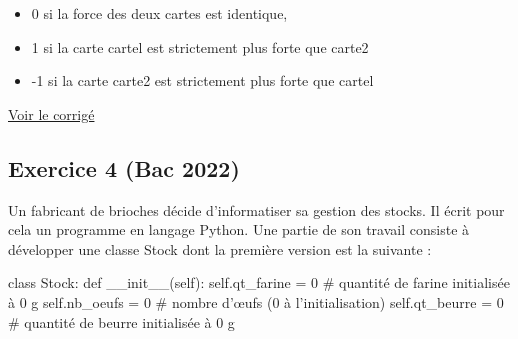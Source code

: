 \documentclass[
  a4paper,
  DIV=11,
  numbers=noendperiod]{scrartcl}
\newenvironment{Shaded}{\begin{snugshade}}{\end{snugshade}}
\newcommand{\CommentTok}[1]{\textcolor[rgb]{0.37,0.37,0.37}{#1}}
\newcommand{\DecValTok}[1]{\textcolor[rgb]{0.68,0.00,0.00}{#1}}
\newcommand{\FunctionTok}[1]{\textcolor[rgb]{0.28,0.35,0.67}{#1}}
\newcommand{\KeywordTok}[1]{\textcolor[rgb]{0.00,0.23,0.31}{#1}}
\newcommand{\NormalTok}[1]{\textcolor[rgb]{0.00,0.23,0.31}{#1}}
\newcommand{\OperatorTok}[1]{\textcolor[rgb]{0.37,0.37,0.37}{#1}}
\newcommand{\VariableTok}[1]{\textcolor[rgb]{0.07,0.07,0.07}{#1}}
\providecommand{\tightlist}{%
  \setlength{\itemsep}{0pt}\setlength{\parskip}{0pt}}\usepackage{longtable,booktabs,array}
\begin{document}
\begin{enumerate}
  \begin{itemize}
  \tightlist
  \item
    0 si la force des deux cartes est identique,
  \item
    1 si la carte cartel est strictement plus forte que carte2
  \item
    -1 si la carte carte2 est strictement plus forte que cartel
  \end{itemize}
\end{enumerate}

\href{https://flallemand.fr/notebook/?from=https://flallemand.fr/nsi/assets/notebooks/exo3_POO_CORR.ipynb}{Voir
le corrigé}

\hypertarget{fa-solid-pencil-alt-exercice-4-bac-2022}{%
\subsection{\texorpdfstring{ Exercice 4 (Bac
2022)}{ Exercice 4 (Bac 2022)}}\label{fa-solid-pencil-alt-exercice-4-bac-2022}}

Un fabricant de brioches décide d'informatiser sa gestion des stocks. Il
écrit pour cela un programme en langage Python. Une partie de son
travail consiste à développer une classe Stock dont la première version
est la suivante :

\begin{Shaded}
\begin{Highlighting}[]
\KeywordTok{class}\NormalTok{ Stock:}
    \KeywordTok{def} \FunctionTok{\_\_init\_\_}\NormalTok{(}\VariableTok{self}\NormalTok{):}
        \VariableTok{self}\NormalTok{.qt\_farine }\OperatorTok{=} \DecValTok{0} \CommentTok{\# quantité de farine initialisée à 0 g}
        \VariableTok{self}\NormalTok{.nb\_oeufs }\OperatorTok{=} \DecValTok{0} \CommentTok{\# nombre d’œufs (0 à l’initialisation)}
        \VariableTok{self}\NormalTok{.qt\_beurre }\OperatorTok{=} \DecValTok{0} \CommentTok{\# quantité de beurre initialisée à 0 g}
\end{Highlighting}
\end{Shaded}
\end{document}

